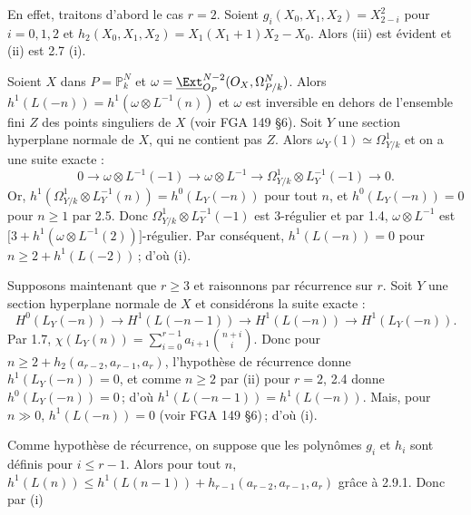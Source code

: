 
En
effet, traitons d'abord le cas \(r=2\). Soient \(g_i(X_0,X_1,X_2)=X_{2-i}^2\) pour \(i=0,1,2\) et \(h_2(X_0,X_1,X_2)=X_1(X_1+1)X_2-X_0\). Alors (iii) est évident et (ii) est 2.7 (i).

Soient \(X\) dans \(P=\mathbb P_k^N\) et \(\omega=\underline{\Ext}^{N-2}_{{O}_P}({O}_X,\Omega^N_{P/k})\). Alors \(h^1(L(-n))=h^1(\omega\otimes L^{-1}(n))\) et \(\omega\) est inversible en dehors de l'ensemble fini \(Z\) des points singuliers de \(X\) (voir FGA 149 \S 6). Soit \(Y\) une section hyperplane normale de \(X\), qui ne contient pas \(Z\). Alors \(\omega_Y(1)\simeq\Omega^1_{Y/k}\) et on a une suite exacte :
\[
0\longrightarrow \omega\otimes L^{-1}(-1)
\longrightarrow \omega\otimes L^{-1}
\longrightarrow \Omega^1_{Y/k}\otimes L_Y^{-1}(-1)
\longrightarrow0.
\]
Or, \(h^1(\Omega^1_{Y/k}\otimes L_Y^{-1}(n))=h^0(L_Y(-n))\) pour tout \(n\), et \(h^0(L_Y(-n))=0\) pour \(n\ge1\) par 2.5. Donc \(\Omega^1_{Y/k}\otimes L_Y^{-1}(-1)\) est 3-régulier et par 1.4, \(\omega\otimes L^{-1}\) est \(\bigl[3+h^1(\omega\otimes L^{-1}(2))\bigr]\)-régulier. Par conséquent, \(h^1(L(-n))=0\) pour \(n\ge2+h^1(L(-2))\)\,; d'où (i).

Supposons maintenant que \(r\ge3\) et raisonnons par récurrence sur \(r\). Soit \(Y\) une section hyperplane normale de \(X\) et considérons la suite exacte :
\[
H^0(L_Y(-n))\longrightarrow H^1(L(-n-1))
\longrightarrow H^1(L(-n))\longrightarrow H^1(L_Y(-n)).
\tag{2.9.1}
\]
Par 1.7, \(\chi(L_Y(n))=\sum_{i=0}^{r-1}a_{i+1}\binom{n+i}{i}\). Donc pour \(n\ge2+h_2(a_{r-2},a_{r-1},a_r)\), l'hypothèse de récurrence donne \(h^1(L_Y(-n))=0\), et comme \(n\ge2\) par (ii) pour \(r=2\), 2.4 donne \(h^0(L_Y(-n))=0\)\,; d'où \(h^1(L(-n-1))=h^1(L(-n))\). Mais, pour \(n\gg0\), \(h^1(L(-n))=0\) (voir FGA 149 \S 6)\,; d'où (i).

Comme hypothèse de récurrence, on suppose que les polynômes \(g_i\) et \(h_i\) sont définis pour \(i\le r-1\). Alors pour tout \(n\), \(h^1(L(n))\le h^1(L(n-1))+h_{r-1}(a_{r-2},a_{r-1},a_r)\) grâce à 2.9.1. Donc par (i) 

